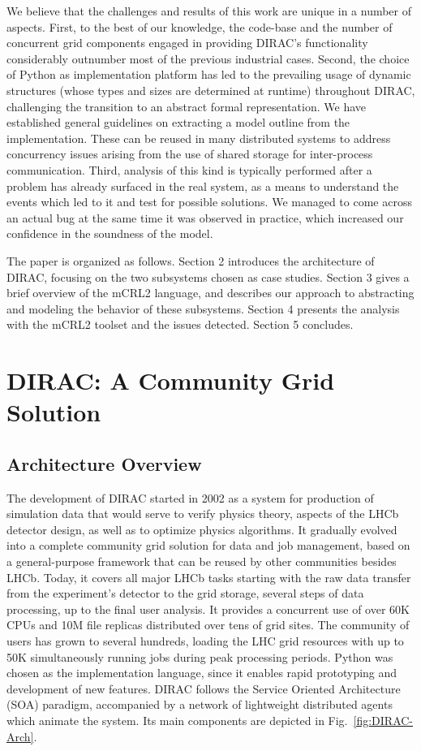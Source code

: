 \documentclass[10pt,conference]{IEEEtran}
\begin{document}
We believe that the challenges and results of this work are unique in
a number of aspects. First, to the best of our knowledge, the code-base
and the number of concurrent grid components engaged in providing DIRAC's
functionality considerably outnumber most of the previous industrial cases. Second,
the choice of Python as implementation platform has led to the prevailing
usage of dynamic structures (whose types and sizes are determined at
runtime) throughout DIRAC, challenging the transition to an abstract
formal representation. We have established general
guidelines on extracting a model outline from the implementation. These
can be reused in many distributed systems to address concurrency issues arising 
from the use of shared storage for inter-process communication. Third,
analysis of this kind is typically performed after a problem has already
surfaced in the real system, as a means to understand the events which
led to it and test for possible solutions. We managed to come across an
actual bug at the same time it was observed in practice, which increased
our confidence in the soundness of the model.

The paper is organized as follows. Section 2 introduces the architecture
of DIRAC, focusing on the two subsystems chosen as case studies. Section 3 gives a brief
overview of the mCRL2 language, and describes our approach to abstracting
and modeling the behavior of these subsystems. Section 4 presents the
analysis with the mCRL2 toolset and the issues detected. Section 5
concludes. 

\section{DIRAC: A Community Grid Solution}
\label{sec:Section_2}
\subsection{Architecture Overview}

The development of DIRAC started in 2002 as a system for production of simulation
data that would serve to verify physics theory, aspects of the LHCb detector design, as
well as to optimize physics algorithms. It gradually evolved into a complete community
grid solution for data and job management, based on a general-purpose framework
that can be reused by other communities besides LHCb. Today, it covers all major
LHCb tasks starting with the raw data transfer from the experiment's detector to
the grid storage, several steps of data processing, up to the final user
analysis. 
It provides a concurrent use of over 60K CPUs and 10M file replicas distributed over
tens of grid sites. The community of users has grown to several hundreds, loading the 
LHC grid resources with up to 50K simultaneously running jobs during peak processing periods.
Python was chosen as the implementation language, since it enables
rapid prototyping and development of new features. DIRAC follows the Service
Oriented Architecture (SOA) paradigm, accompanied by a network of lightweight
distributed agents which animate the system. Its main components are depicted in
Fig.~\ref{fig:DIRAC-Arch}. 
\end{document}
